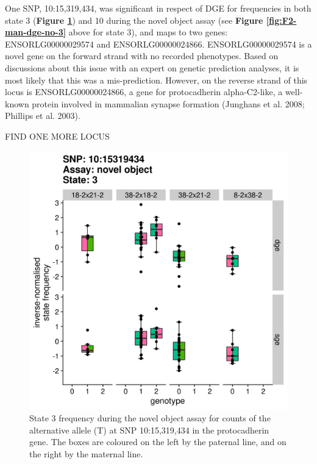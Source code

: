 \documentclass[
]{book}
\begin{document}
One SNP, 10:15,319,434, was significant in respect of DGE for frequencies in both state 3 (\textbf{Figure \ref{fig:sig-snp-10-15mb}}) and 10 during the novel object assay (see \textbf{Figure \ref{fig:F2-man-dge-no-3}} above for state 3), and maps to two genes: ENSORLG00000029574 and ENSORLG00000024866. ENSORLG00000029574 is a novel gene on the forward strand with no recorded phenotypes. Based on discussions about this issue with an expert on genetic prediction analyses, it is most likely that this was a mis-prediction. However, on the reverse strand of this locus is ENSORLG00000024866, a gene for protocadherin alpha-C2-like, a well-known protein involved in mammalian synapse formation (Junghans et al. 2008; Phillips et al. 2003).

FIND ONE MORE LOCUS



\begin{figure}
\includegraphics[width=1\linewidth]{figs/mikk_behaviour/sig_snps_boxplots/3-10:15319434} \caption{State 3 frequency during the novel object assay for counts of the alternative allele (T) at SNP 10:15,319,434 in the protocadherin gene. The boxes are coloured on the left by the paternal line, and on the right by the maternal line.}\label{fig:sig-snp-10-15mb}
\end{figure}
\end{document}
